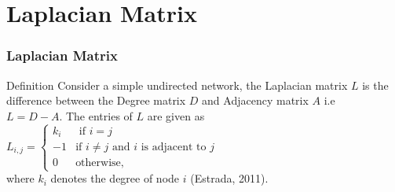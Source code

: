 \documentclass{beamer}
\begin{document}
\section{Laplacian Matrix}
\begin{frame}
	\frametitle{Laplacian Matrix}
	\begin{block}{Definition}
		Consider a simple undirected network, the Laplacian matrix $L$ is the difference between the Degree matrix $D$ and Adjacency matrix $A$ i.e\\
		$L= D-A$. The entries of $L$ are given as\\
		\vspace{0.5 cm}
    	$
    	L_{i,j} = \begin{cases}
    	k_i & \text{ if }  i=j\\
    	-1  & \text{if } i \neq j \text{ and } i \text{ is adjacent to } j \\
    	0 & \text{otherwise},
    	\end{cases}
    	$\\
    	where $k_i$ denotes the degree of node $i$ (Estrada, 2011).
    \end{block}
\end{frame}
\end{document}
